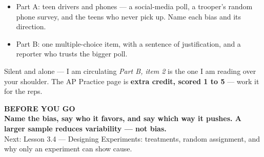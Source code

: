\documentclass[aspectratio=169, 11pt]{beamer}
\begin{document}
\begin{frame}[t, plain]
  \begin{itemize}\setlength{\itemsep}{5pt}
    \item Part A: teen drivers and phones --- a social-media poll, a trooper's random phone
          survey, and the teens who never pick up. Name each bias and its direction.
    \item Part B: one multiple-choice item, with a sentence of justification, and a reporter
          who trusts the bigger poll.
  \end{itemize}
  \begin{block}{Silent and alone --- I am circulating}
    \emph{Part B, item 2} is the one I am reading over your shoulder. The AP Practice page is
    \textbf{extra credit, scored 1 to 5} --- work it for the reps.
  \end{block}
\end{frame}

{
\begin{frame}[plain]
  \vspace{1.5cm}\hspace{0.8cm}%
  \begin{minipage}{0.86\textwidth}
    {\color{goldacc}\bfseries\small BEFORE YOU GO}\\[0.7cm]
    {\color{white}\bfseries\Large Name the bias, say who it favors, and say which way it
    pushes. A larger sample reduces variability --- not bias.}\\[0.9cm]
    {\color{skymid}\small Next: Lesson 3.4 --- Designing Experiments: treatments, random
    assignment, and why only an experiment can show cause.}
  \end{minipage}
\end{frame}
}
\end{document}
